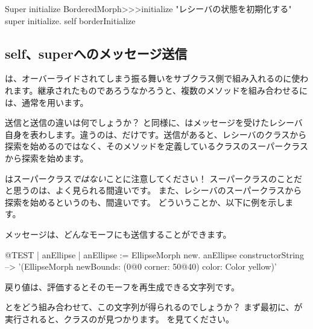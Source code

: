 \documentclass[a4paper,10pt,twoside]{book}
\begin{document}

\begin{method}[morphinit]{Super initialize}
BorderedMorph>>>initialize
	"レシーバの状態を初期化する"
	super initialize.
	self borderInitialize
\end{method}


\subsection{self、superへのメッセージ送信}

\super{}は、オーバーライドされてしまう振る舞いをサブクラス側で組み入れるのに使われます。継承されたものであろうなかろうと、複数のメソッドを組み合わせるには、通常\self{}を用います。

\self 送信と\super 送信の違いは何でしょうか？ \self と同様に、\super はメッセージを受けたレシーバ自身を表わします。違うのは、だけです。\super 送信があると、レシーバのクラスから探索を始めるのではなく、そのメソッドを定義しているクラスのスーパークラスから探索を始めます。


\super はスーパークラス\emph{ではない}ことに注意してください！
スーパークラスのことだと思うのは、よく見られる間違いです。
また、レシーバのスーパークラスから探索を始めるというのも、間違いです。
どういうことか、以下に例を示します。

メッセージは、どんなモーフにも送信することができます。
\begin{code}{@TEST | anEllipse | anEllipse := EllipseMorph new.}
anEllipse constructorString --> '(EllipseMorph newBounds: (0@0 corner: 50@40) color: Color yellow)'
\end{code}
戻り値は、評価するとそのモーフを再生成できる文字列です。

\self と\super をどう組み合わせて、この文字列が得られるのでしょうか？
まず最初に、が実行されると、クラスのが見つかります。
を見てください。
\end{document}
